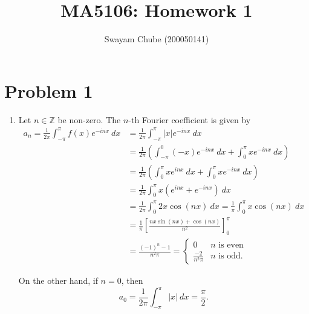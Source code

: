 \documentclass[12pt]{amsart}
\title{MA5106: Homework 1}
\author{Swayam Chube (200050141)}
\newcommand{\Z}{\mathbb{Z}}
\begin{document}
\maketitle 

\section{Problem 1}

\begin{enumerate}[label=(\alph*)]
    \item Let $n\in\Z$ be non-zero. The $n$-th Fourier coefficient is given by 
    \begin{align*}
        a_n = \frac{1}{2\pi}\int_{-\pi}^\pi f(x)e^{-inx}~dx &= \frac{1}{2\pi}\int_{-\pi}^\pi |x|e^{-inx}~dx\\
        &= \frac{1}{2\pi}\left(\int_{-\pi}^0 (-x)e^{-inx}~dx + \int_{0}^\pi xe^{-inx}~dx\right)\\
        &= \frac{1}{2\pi}\left(\int_{0}^\pi xe^{inx}~dx + \int_{0}^\pi xe^{-inx}~dx\right)\\
        &= \frac{1}{2\pi}\int_{0}^\pi x\left(e^{inx} + e^{-inx}\right)~dx\\
        &= \frac{1}{2\pi}\int_0^\pi 2x\cos(nx)~dx = \frac{1}{\pi}\int_{0}^\pi x\cos(nx)~dx\\
        &= \frac{1}{\pi}\left[\frac{nx\sin(nx) + \cos(nx)}{n^2}\right]_0^{\pi}\\
        &= \frac{(-1)^n - 1}{n^2\pi} = 
        \begin{cases}
            0 & \text{$n$ is even}\\
            \frac{-2}{n^2\pi} & \text{$n$ is odd}.
        \end{cases}
    \end{align*}

    On the other hand, if $n = 0$, then 
    \begin{equation*}
        a_0 = \frac{1}{2\pi}\int_{-\pi}^\pi |x|~dx = \frac{\pi}{2}.
    \end{equation*}


\end{enumerate}
\end{document}
